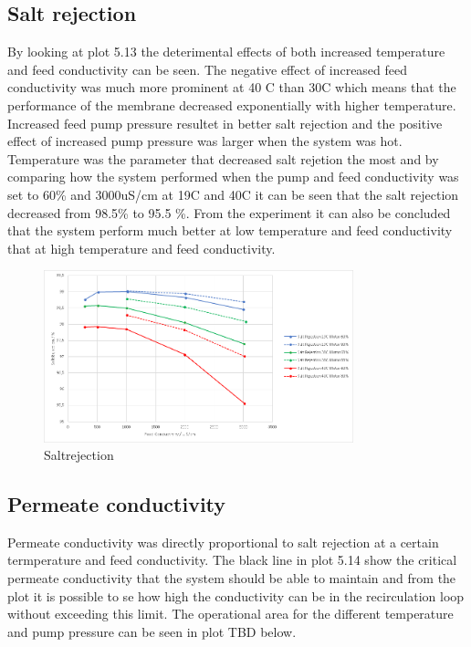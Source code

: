 \subsection{Salt rejection}

By looking at plot 5.13 the deterimental effects of both increased temperature and feed conductivity can be seen. The negative effect of increased feed conductivity was much more prominent at 40 C than 30C which means that the performance of the membrane decreased exponentially with higher temperature. Increased feed pump pressure resultet in better salt rejection and the positive effect of increased pump pressure was larger when the system was hot. Temperature was the parameter that decreased salt rejetion the most and by comparing how the system performed when the pump and feed conductivity was set to 60\% and 3000uS/cm at 19C and 40C it can be seen that the salt rejection decreased from 98.5\% to 95.5 \%. From the experiment it can also be concluded that the system perform much better at low temperature and feed conductivity that at high temperature and feed conductivity. 

\begin{figure}[H]
    \centering
    \includegraphics[width=0.8\textwidth]{SaltRejection}
    \caption{Saltrejection}
    \label{fig:PressConn}
\end{figure}
 
\subsection{Permeate conductivity}

Permeate conductivity was directly proportional to salt rejection at a certain termperature and feed conductivity. The black line in plot 5.14 show the critical permeate conductivity that the system should be able to maintain and from the plot it is possible to se how high the conductivity can be in the recirculation loop without exceeding this limit. The operational area for the different temperature and pump pressure can be seen in plot TBD below.

